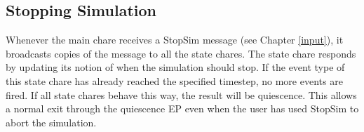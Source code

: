 \subsection{Stopping Simulation}

Whenever the main chare receives a StopSim message (see Chapter
\ref{input}), it broadcasts copies of the message to all the state
chares.  The state chare responds by updating its notion of when the
simulation should stop.  If the event type of this state chare has
already reached the specified timestep, no more events are fired.  If
all state chares behave this way, the result will be quiescence.  This
allows a normal exit through the quiescence EP even when the user has
used StopSim to abort the simulation.